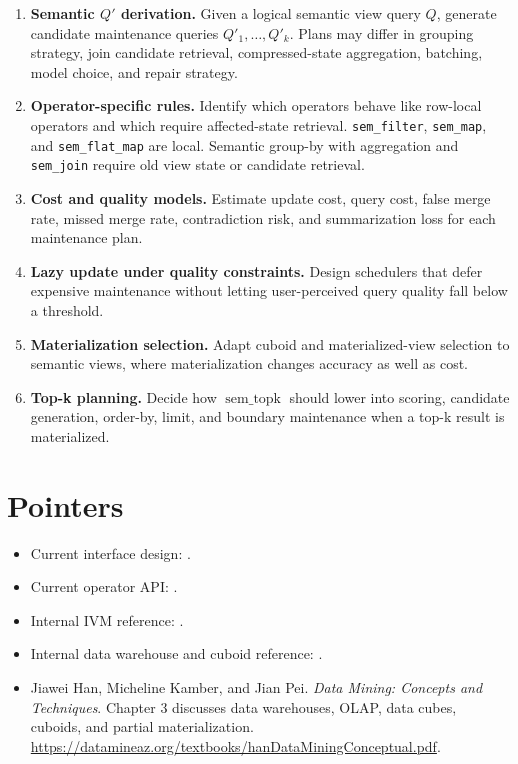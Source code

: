 \documentclass[11pt]{article}
\newcommand{\Q}{Q}
\newcommand{\DQ}{Q'}
\newcommand{\SemTopK}{\operatorname{sem\_topk}}
\begin{document}
\begin{enumerate}[leftmargin=*]
  \item \textbf{Semantic \(\DQ\) derivation.} Given a logical semantic view
  query \(\Q\), generate candidate maintenance queries
  \(\DQ_1,\ldots,\DQ_k\). Plans may differ in grouping strategy, join
  candidate retrieval, compressed-state aggregation, batching, model choice,
  and repair strategy.

  \item \textbf{Operator-specific rules.} Identify which operators behave like
  row-local operators and which require affected-state retrieval.
  \texttt{sem\_filter}, \texttt{sem\_map}, and \texttt{sem\_flat\_map} are
  local. Semantic group-by with aggregation and \texttt{sem\_join} require old
  view state or candidate retrieval.

  \item \textbf{Cost and quality models.} Estimate update cost, query cost,
  false merge rate, missed merge rate, contradiction risk, and summarization
  loss for each maintenance plan.

  \item \textbf{Lazy update under quality constraints.} Design schedulers that
  defer expensive maintenance without letting user-perceived query quality fall
  below a threshold.

  \item \textbf{Materialization selection.} Adapt cuboid and materialized-view
  selection to semantic views, where materialization changes accuracy as well
  as cost.

  \item \textbf{Top-k planning.} Decide how \(\SemTopK\) should lower into
  scoring, candidate generation, order-by, limit, and boundary maintenance when
  a top-k result is materialized.
\end{enumerate}

\section{Pointers}

\begin{itemize}[leftmargin=*]
  \item Current interface design:
  .

  \item Current operator API:
  .

  \item Internal IVM reference:
  .

  \item Internal data warehouse and cuboid reference:
  .

  \item Jiawei Han, Micheline Kamber, and Jian Pei. \emph{Data Mining:
  Concepts and Techniques}. Chapter 3 discusses data warehouses, OLAP, data
  cubes, cuboids, and partial materialization.
  \url{https://datamineaz.org/textbooks/hanDataMiningConceptual.pdf}.
\end{itemize}
\end{document}
